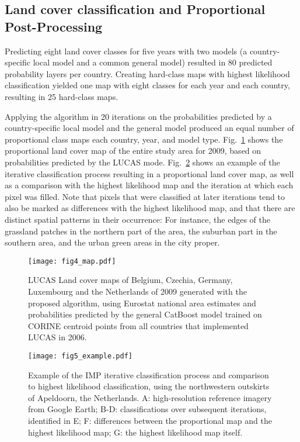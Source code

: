     \subsection{Land cover classification and Proportional Post-Processing}

    Predicting eight land cover classes for five years with two models (a country-specific local model and a common general model) resulted in 80 predicted probability layers per country. Creating hard-class maps with highest likelihood classification yielded one map with eight classes for each year and each country, resulting in 25 hard-class maps. 
    
    Applying the algorithm in 20 iterations on the probabilities predicted by a country-specific local model and the general model produced an equal number of proportional class maps each country, year, and model type. Fig.~\ref{fig:big_map_proportional} shows the proportional land cover map of the entire study area for 2009, based on probabilities predicted by the LUCAS mode. Fig.~\ref{fig:map_example} shows an example of the iterative classification process resulting in a proportional land cover map, as well as a comparison with the highest likelihood map and the iteration at which each pixel was filled. Note that pixels that were classified at later iterations tend to also be marked as differences with the highest likelihood map, and that there are distinct spatial patterns in their occurrence: For instance, the edges of the grassland patches in the northern part of the area, the suburban part in the southern area, and the urban green areas in the city proper.

    \begin{figure}[H]
        \centering
        \texttt{[image: fig4\_map.pdf]}
        \caption{LUCAS Land cover maps of Belgium, Czechia, Germany, Luxembourg and the Netherlands of 2009 generated with the proposed algorithm, using Eurostat national area estimates and probabilities predicted by the general CatBoost model trained on CORINE centroid points from all countries that implemented LUCAS in 2006.}
        \label{fig:big_map_proportional}
    \end{figure}
    
    \begin{figure}[H]
        \centering
        \texttt{[image: fig5\_example.pdf]}
        \caption{Example of the IMP iterative classification process and comparison to highest likelihood classification, using the northwestern outskirts of Apeldoorn, the Netherlands. A: high-resolution reference imagery from Google Earth; B-D: classifications over subsequent iterations, identified in E; F: differences between  the proportional map and the highest likelihood map; G: the highest likelihood map itself.}
        \label{fig:map_example}
    \end{figure}

